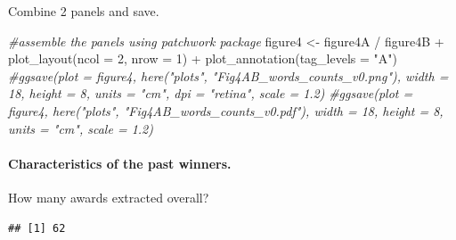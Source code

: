 \documentclass[
]{article}
\newenvironment{Shaded}{\begin{snugshade}}{\end{snugshade}}
\newcommand{\AttributeTok}[1]{\textcolor[rgb]{0.77,0.63,0.00}{#1}}
\newcommand{\CommentTok}[1]{\textcolor[rgb]{0.56,0.35,0.01}{\textit{#1}}}
\newcommand{\DecValTok}[1]{\textcolor[rgb]{0.00,0.00,0.81}{#1}}
\newcommand{\FunctionTok}[1]{\textcolor[rgb]{0.00,0.00,0.00}{#1}}
\newcommand{\NormalTok}[1]{#1}
\newcommand{\OtherTok}[1]{\textcolor[rgb]{0.56,0.35,0.01}{#1}}
\newcommand{\SpecialCharTok}[1]{\textcolor[rgb]{0.00,0.00,0.00}{#1}}
\newcommand{\StringTok}[1]{\textcolor[rgb]{0.31,0.60,0.02}{#1}}
\begin{document}
Combine 2 panels and save.

\begin{Shaded}
\begin{Highlighting}[]
\CommentTok{\#assemble the panels using patchwork package}
\NormalTok{figure4 }\OtherTok{\textless{}{-}}\NormalTok{ figure4A }\SpecialCharTok{/}\NormalTok{ figure4B }\SpecialCharTok{+} 
  \FunctionTok{plot\_layout}\NormalTok{(}\AttributeTok{ncol =} \DecValTok{2}\NormalTok{, }\AttributeTok{nrow =} \DecValTok{1}\NormalTok{) }\SpecialCharTok{+}
  \FunctionTok{plot\_annotation}\NormalTok{(}\AttributeTok{tag\_levels =} \StringTok{"A"}\NormalTok{)}
\CommentTok{\#ggsave(plot = figure4, here("plots", "Fig4AB\_words\_counts\_v0.png"), width = 18, height = 8, units = "cm", dpi = "retina", scale = 1.2)}
\CommentTok{\#ggsave(plot = figure4, here("plots", "Fig4AB\_words\_counts\_v0.pdf"), width = 18, height = 8, units = "cm", scale = 1.2)}
\end{Highlighting}
\end{Shaded}

\hypertarget{characteristics-of-the-past-winners.}{%
\paragraph{Characteristics of the past
winners.}\label{characteristics-of-the-past-winners.}}

How many awards extracted overall?

\begin{Shaded}
\end{Shaded}

\begin{verbatim}
## [1] 62
\end{verbatim}

\begin{Shaded}
\end{Shaded}
\end{document}
